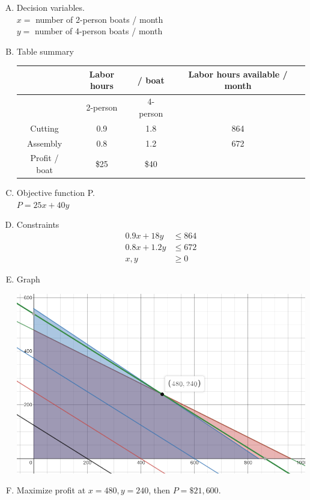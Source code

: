 \documentclass[14pt]{extarticle}
\begin{document}
\begin{enumerate}[A)]
	\item Decision variables.\\
	$x=$ number of 2-person boats / month \\
	$y=$ number of 4-person boats / month
	\item Table summary \\
	\begin{tabular}{|c|c|c|c|}
		\hline
		& Labor hours & / boat & Labor hours available / month \\
		\hline
		& 2-person & 4-person &  \\
		\hline \hline
		Cutting & 0.9 & 1.8 & 864 \\
		\hline
		Assembly & 0.8 & 1.2 & 672 \\
		\hline \hline
		Profit / boat & \$25 & \$40 &  \\
		\hline
	\end{tabular}
	\item Objective function P. \\
	$P = 25x + 40y$
	\item Constraints
	\begin{align*}
		0.9x + 18y &\leq 864 \\
		0.8x + 1.2y &\leq 672 \\
		x,y &\geq 0
	\end{align*}
	\item Graph
	\begin{center}
		\includegraphics[width=0.9\linewidth]{5-3-p1}
	\end{center}
	\item Maximize profit at $x=480, y=240$, then $P=\$21,600$.
\end{enumerate}
\end{document}
